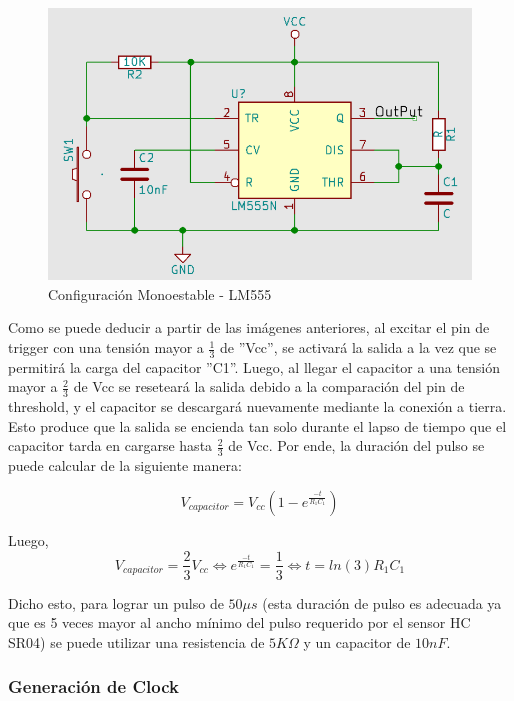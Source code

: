 \begin{figure}[H]
\centering
\includegraphics[scale=0.4]{monoestable555.PNG}
\caption{Configuración Monoestable - LM555}
\end{figure}

Como se puede deducir a partir de las imágenes anteriores, al excitar
el pin de trigger con una tensión mayor a $\frac{1}{3}$ de ''Vcc'',
se activará la salida a la vez que se permitirá la carga del capacitor
''C1''. Luego, al llegar el capacitor a una tensión mayor a $\frac{2}{3}$
de Vcc se reseteará la salida debido a la comparación del pin de threshold,
y el capacitor se descargará nuevamente mediante la conexión a tierra.
Esto produce que la salida se encienda tan solo durante el lapso de
tiempo que el capacitor tarda en cargarse hasta $\frac{2}{3}$ de
Vcc. Por ende, la duración del pulso se puede calcular de la siguiente
manera:

\begin{equation}
V_{capacitor}=V_{cc}(1-e^{\frac{-t}{R_{1}C_{1}}})
\end{equation}

Luego, 
\begin{equation}
V_{capacitor}=\frac{2}{3}V_{cc}\Longleftrightarrow e^{\frac{-t}{R_{1}C_{1}}}=\frac{1}{3}\Longleftrightarrow t=ln(3)R_{1}C_{1}    
\end{equation}


Dicho esto, para lograr un pulso de $50\mu s$ (esta duración de pulso
es adecuada ya que es 5 veces mayor al ancho mínimo del pulso requerido
por el sensor HC SR04) se puede utilizar una resistencia de $5K\Omega$
y un capacitor de $10nF$.

\subsubsection{Generación de Clock}

